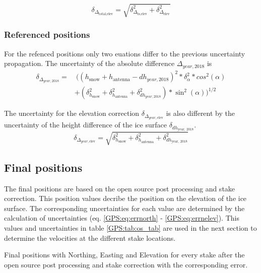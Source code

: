 \begin{equation}
	\delta_{\Delta_{\text{total,elev}}} = \sqrt{\delta_{\Delta_{\text{ts,elev}}}^2 +\delta_{\Delta_{\text{elev}}}^2}
	\label{GPS:eq:errnelev}
\end{equation}

\subsubsection*{Referenced positions}

For the refenced positions only two euations differ to the previous uncertainty propagation. 
The uncertainty of the absolute difference $\Delta_{year,2018}$ is
\begin{equation}
\begin{split}
\delta_{\Delta_{year,2018}} = & 
\ ((h_{\text{snow}} + h_{\text{antenna}} - dh_{year,2018})^2 * \delta_{\alpha}^2 * cos^2(\alpha)\\
&+ (\delta_{h_{\text{snow}}}^2 + \delta_{h_{\text{antenna}}}^2 + \delta_{dh_{year,2018}}^2) * \sin^2(\alpha))^{1/2}
\end{split}
\end{equation}

The uncertainty for the elevation correction $\delta_{\Delta_{year, \text{elev}}}$ is also different by the uncertainty of the height difference of the ice surface $\delta_{dh_{\text{year, 2018}}}$.
\begin{equation}
	\delta_{\Delta_{year, \text{elev}}} = \sqrt{\delta_{h_{\text{snow}}}^2 + \delta_{h_{\text{antenna}}}^2 + \delta_{dh_{\text{year, 2018}}}^2}
\end{equation}

\subsection{Final positions}

The final positions are based on the open source post processing and stake correction.
This position values decribe the position on the elevation of the ice surface. 
The corresponding uncertainties for each value are determined by the calculation of uncertainties (eq. \ref{GPS:eq:errnorth} - \ref{GPS:eq:errnelev}). 
This values and uncertainties in table \ref{GPS:tab:os_tab} are used in the next section to determine the velocities at the different stake locations. 

\begin{table}[H]
	\caption{Final positions with Northing, Easting and Elevation for every stake after the open source post processing and stake correction with the corresponding error.}
	\centering
	
	\label{GPS:tab:os_tab}
\end{table}
